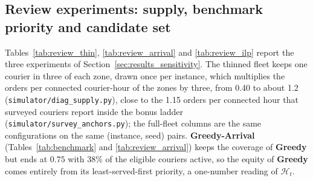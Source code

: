 \documentclass[a4paper,11pt,review,3p,authoryear]{elsarticle}
\newcommand{\Hist}{\mathcal{H}}
\begin{document}
\subsection{Review experiments: supply, benchmark priority and candidate set}
\label{sec:App_review}

Tables~\ref{tab:review_thin}, \ref{tab:review_arrival} and \ref{tab:review_ilp} report the three experiments of Section~\ref{sec:results_sensitivity}. The thinned fleet keeps one courier in three of each zone, drawn once per instance, which multiplies the orders per connected courier-hour of the zones by three, from 0.40 to about 1.2 (\texttt{simulator/diag\_supply.py}), close to the 1.15 orders per connected hour that surveyed couriers report inside the bonus ladder (\texttt{simulator/survey\_anchors.py}); the full-fleet columns are the same configurations on the same (instance, seed) pairs. \textbf{Greedy-Arrival} (Tables~\ref{tab:benchmark} and \ref{tab:review_arrival}) keeps the coverage of \textbf{Greedy} but ends at $0.75$ with 38\% of the eligible couriers active, so the equity of \textbf{Greedy} comes entirely from its least-served-first priority, a one-number reading of $\Hist_t$.
\end{document}
